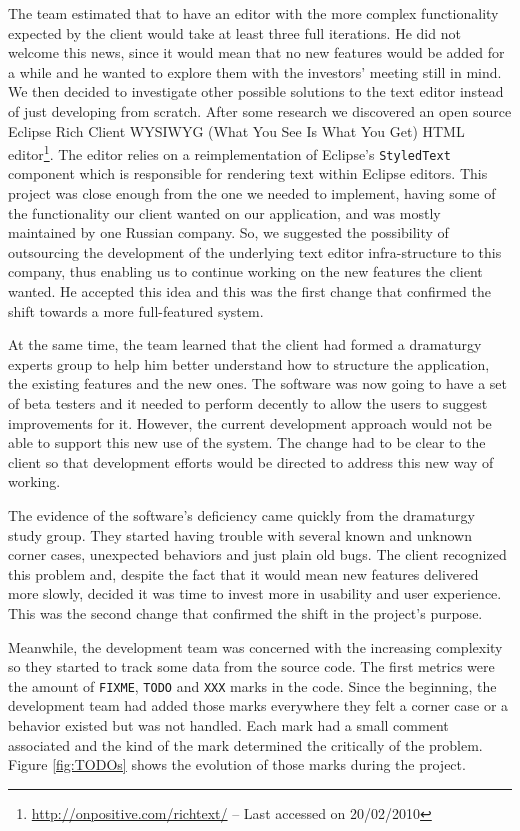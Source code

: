 \documentclass[lnbip]{svmultln}
\begin{document}
The team estimated that to have an editor with the more complex
functionality expected by the client would take at least three full
iterations. He did not welcome this news, since it would mean that no
new features would be added for a while and he wanted to explore them
with the investors' meeting still in mind.  We then decided to
investigate other possible solutions to the text editor instead of
just developing from scratch. After some research we discovered an
open source Eclipse Rich Client WYSIWYG (What You See Is What You Get)
HTML editor\footnote{\url{http://onpositive.com/richtext/} -- Last
  accessed on 20/02/2010}. The editor relies on a reimplementation of
Eclipse's \texttt{StyledText} component which is responsible for
rendering text within Eclipse editors. This project was close enough
from the one we needed to implement, having some of the functionality
our client wanted on our application, and was mostly maintained by one
Russian company. So, we suggested the possibility of outsourcing the
development of the underlying text editor infra-structure to this
company, thus enabling us to continue working on the new features the
client wanted. He accepted this idea and this was the first change
that confirmed the shift towards a more full-featured system.

At the same time, the team learned that the client had formed a
dramaturgy experts group to help him better understand how to
structure the application, the existing features and the new ones. The
software was now going to have a set of beta testers and it needed to
perform decently to allow the users to suggest improvements for
it. However, the current development approach would not be able to
support this new use of the system. The change had to be clear to the
client so that development efforts would be directed to address this
new way of working.

The evidence of the software's deficiency came quickly from the
dramaturgy study group. They started having trouble with several known
and unknown corner cases, unexpected behaviors and just plain old
bugs. The client recognized this problem and, despite the fact that it
would mean new features delivered more slowly, decided it was time to
invest more in usability and user experience. This was the second
change that confirmed the shift in the project's purpose.

Meanwhile, the development team was concerned with the increasing
complexity so they started to track some data from the source
code. The first metrics were the amount of \texttt{FIXME},
\texttt{TODO} and \texttt{XXX} marks in the code. Since the beginning,
the development team had added those marks everywhere they felt a corner
case or a behavior existed but was not handled. Each mark had a small
comment associated and the kind of the mark determined the critically
of the problem. Figure \ref{fig:TODOs} shows the evolution of those
marks during the project.
\end{document}
